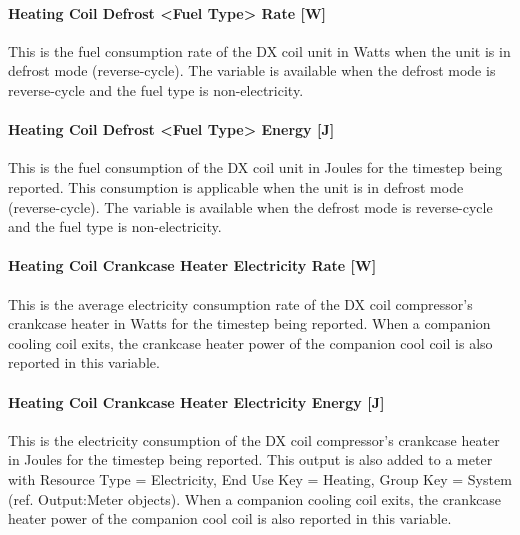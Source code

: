 \paragraph{Heating Coil Defrost \textless{}Fuel Type\textgreater{} Rate {[}W{]}}\label{heating-coil-defrost-fuel-type-rate-w}

This is the fuel consumption rate of the DX coil unit in Watts when the unit is in defrost mode (reverse-cycle). The variable is available when the defrost mode is reverse-cycle and the fuel type is non-electricity.

\paragraph{Heating Coil Defrost \textless{}Fuel Type\textgreater{} Energy {[}J{]}}\label{heating-coil-defrost-fuel-type-energy-j}

This is the fuel consumption of the DX coil unit in Joules for the timestep being reported. This consumption is applicable when the unit is in defrost mode (reverse-cycle). The variable is available when the defrost mode is reverse-cycle and the fuel type is non-electricity.

\paragraph{Heating Coil Crankcase Heater Electricity Rate {[}W{]}}\label{heating-coil-crankcase-heater-electric-power-w-1}

This is the average electricity consumption rate of the DX coil compressor's crankcase heater in Watts for the timestep being reported. When a companion cooling coil exits, the crankcase heater power of the companion cool coil is also reported in this variable.

\paragraph{Heating Coil Crankcase Heater Electricity Energy {[}J{]}}\label{heating-coil-crankcase-heater-electric-energy-j-1}

This is the electricity consumption of the DX coil compressor's crankcase heater in Joules for the timestep being reported. This output is also added to a meter with Resource Type = Electricity, End Use Key = Heating, Group Key = System (ref. Output:Meter objects). When a companion cooling coil exits, the crankcase heater power of the companion cool coil is also reported in this variable.

